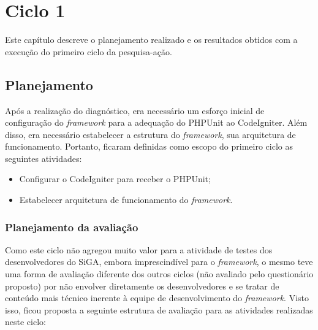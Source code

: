 \chapter{Ciclo 1}
  
  Este capítulo descreve o planejamento realizado e os resultados obtidos com a execução do primeiro ciclo da pesquisa-ação.
  
  \section{Planejamento}
  
      Após a realização do diagnóstico, era necessário um esforço inicial de configuração do \textit{framework} para a 
      adequação do PHPUnit ao CodeIgniter. Além disso, era necessário estabelecer a estrutura do \textit{framework},
      sua arquitetura de funcionamento. Portanto, ficaram definidas como escopo do primeiro ciclo as seguintes atividades:
      
      \begin{itemize}
    
    \item Configurar o CodeIgniter para receber o PHPUnit;
    
    \item Estabelecer arquitetura de funcionamento do \textit{framework}.
    
      \end{itemize}
      
      
      \subsection{Planejamento da avaliação}
      
      Como este ciclo não agregou muito valor para a atividade de testes dos desenvolvedores do SiGA,
      embora imprescindível para o \textit{framework}, o mesmo teve uma forma de avaliação diferente
      dos outros ciclos (não avaliado pelo questionário proposto) por não envolver diretamente os desenvolvedores e se
      tratar de conteúdo mais técnico inerente à equipe de desenvolvimento do \textit{framework}. Visto isso, ficou proposta
      a seguinte estrutura de avaliação para as atividades realizadas neste ciclo:
      
